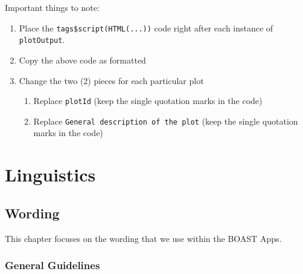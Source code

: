 \documentclass[
]{book}
\newenvironment{Shaded}{\begin{snugshade}}{\end{snugshade}}
\newcommand{\CommentTok}[1]{\textcolor[rgb]{0.56,0.35,0.01}{\textit{#1}}}
\newcommand{\DataTypeTok}[1]{\textcolor[rgb]{0.13,0.29,0.53}{#1}}
\newcommand{\KeywordTok}[1]{\textcolor[rgb]{0.13,0.29,0.53}{\textbf{#1}}}
\newcommand{\NormalTok}[1]{#1}
\newcommand{\OperatorTok}[1]{\textcolor[rgb]{0.81,0.36,0.00}{\textbf{#1}}}
\newcommand{\StringTok}[1]{\textcolor[rgb]{0.31,0.60,0.02}{#1}}
\providecommand{\tightlist}{%
  \setlength{\itemsep}{0pt}\setlength{\parskip}{0pt}}
\begin{document}
\begin{Shaded}
\end{Shaded}

Important things to note:

\begin{enumerate}
\def\labelenumi{\arabic{enumi}.}
\tightlist
\item
  Place the \texttt{tags\$script(HTML(...))} code right after each instance of \texttt{plotOutput}.
\item
  Copy the above code as formatted
\item
  Change the two (2) pieces for each particular plot

  \begin{enumerate}
  \def\labelenumii{\alph{enumii}.}
  \tightlist
  \item
    Replace \texttt{plotId} (keep the single quotation marks in the code)
  \item
    Replace \texttt{General\ description\ of\ the\ plot} (keep the single quotation marks in the code)
  \end{enumerate}
\end{enumerate}

\hypertarget{part-linguistics}{%
\part{Linguistics}\label{part-linguistics}}

\hypertarget{wording}{%
\chapter{Wording}\label{wording}}

This chapter focuses on the wording that we use within the BOAST Apps.

\hypertarget{general-guidelines}{%
\section{General Guidelines}\label{general-guidelines}}
\end{document}
